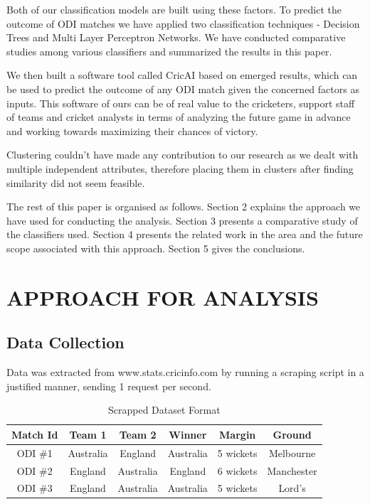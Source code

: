 \documentclass[a4paper, 10pt, conference]{IEEEtran}
\begin{document}
Both of our classification models are built using these factors. To predict the outcome of ODI matches we have applied two classification techniques - Decision Trees and Multi Layer Perceptron Networks. We have conducted comparative studies among various classifiers and summarized the results in this paper.

We then built a software tool called CricAI based on emerged results, which can be used to predict the outcome of any ODI match given the concerned factors as inputs. This software of ours can be of real value to the cricketers, support staff of teams and cricket analysts in terms of analyzing the future game in advance and working towards maximizing their chances of victory.

Clustering couldn't have made any contribution to our research as we dealt with multiple independent attributes, therefore placing them in clusters after finding similarity did not seem feasible.

The rest of this paper is organised as follows. Section 2 explains the approach we have used for conducting the analysis. Section 3 presents a comparative study of the classifiers used. Section 4 presents the related work in the area and the future scope associated with this approach. Section 5 gives the conclusions.

\section{APPROACH FOR ANALYSIS}

\subsection{Data Collection}

Data was extracted from www.stats.cricinfo.com by running a scraping script in a justified manner, sending 1 request per second.
\begin{table}[h!]
  \begin{center}
    \caption{Scrapped Dataset Format}
    \label{tab:table1}
    \begin{tabular}{cccccc} 
      \textbf{Match Id} & \textbf{Team 1} & \textbf{Team 2} & \textbf{Winner} & \textbf{Margin} & \textbf{Ground}\\
      \hline
      ODI \#1 & Australia & England & Australia & 5 wickets & Melbourne\\
      ODI \#2 & England & Australia & England & 6 wickets & Manchester\\
      ODI \#3 & England & Australia & Australia & 5 wickets & Lord's\\
    \end{tabular}
  \end{center}
\end{table}
\end{document}
